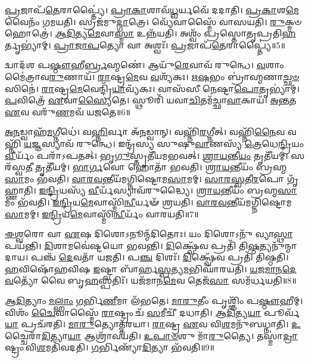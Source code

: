 \-\ul{𑌪𑍍𑌰}\-𑌜𑌾𑌪᳴\-\ul{𑌤𑍇}\-𑌰𑌾𑌪𑍍𑌤𑍍𑌯𑍈॑।
\-\ul{𑌪𑍍𑌰𑌾}\-\-\ul{𑌕𑌾}\-𑌶𑌾𑌵᳴\-\ul{𑌧𑍍𑌵}\-𑌰𑍍𑌯𑌵𑍇᳴ 𑌦𑌦𑌾𑌤𑌿।
\-\ul{𑌪𑍍𑌰}\-\-\ul{𑌕𑌾}\-𑌶\-\ul{𑌮𑍇}\-𑌵𑍈𑌨𑌂᳴ 𑌗𑌮𑌯𑌤𑌿।
𑌸𑍍𑌰𑌜᳴𑌮𑍁\-\ul{𑌦𑍍𑌗𑌾}\-𑌤𑍍𑌰𑍇।
𑌵𑍍𑌯𑍇᳴𑌵𑌾𑌸𑍍𑌮𑍈᳴ 𑌵𑌾𑌸𑌯𑌤𑌿।
\-\ul{𑌰𑍁}\-𑌕𑍍𑌮𑍞 𑌹𑍋𑌤𑍍𑌰𑍇॑।
\-\ul{𑌆}\-\-\ul{𑌦𑌿}\-𑌤𑍍𑌯\-\ul{𑌮𑍇}\-𑌵𑌾\-\ul{𑌸𑍍𑌮𑌾} 𑌉𑌨𑍍𑌨᳴𑌯𑌤𑌿।
𑌅𑌶𑍍𑌵𑌂᳴ 𑌪𑍍𑌰𑌸𑍍𑌤𑍋𑌤𑍃𑌪𑍍𑌰𑌤𑌿\-\ul{𑌹}\-𑌰𑍍𑌤𑍃𑌭𑍍𑌯𑌾॑𑌮𑍍।
\-\ul{𑌪𑍍𑌰𑌾}\-\-\ul{𑌜𑌾}\-\-\ul{𑌪}\-𑌤𑍍𑌯𑍋 𑌵𑌾 𑌅𑌶𑍍𑌵𑌃᳴।
\-\ul{𑌪𑍍𑌰}\-𑌜𑌾𑌪᳴\-\ul{𑌤𑍇}\-𑌰𑌾𑌪𑍍𑌤𑍍𑌯𑍈॑॥5॥

𑌦𑍍𑌵𑌾𑌦᳴𑌶 𑌪\-\ul{𑌷𑍍𑌠𑍗}\-𑌹𑍀\-\ul{𑌰𑍍𑌬𑍍𑌰}\-𑌹𑍍𑌮𑌣𑍇॑।
𑌆𑌯𑍁᳴\-\ul{𑌰𑍇}\-𑌵𑌾𑌵᳴ 𑌰𑍁𑌨𑍍𑌧𑍇।
\-\ul{𑌵}\-𑌶𑌾𑌂 𑌮𑍈॑𑌤𑍍𑌰𑌾𑌵\-\ul{𑌰𑍁}\-𑌣𑌾𑌯᳴।
\-\ul{𑌰𑌾}\-𑌷𑍍𑌟𑍍𑌰\-\ul{𑌮𑍇}\-𑌵 \ul{𑌵}\-𑌶𑍍𑌯᳴𑌕𑌃।
\-\ul{𑌋}\-\-\ul{𑌷}\-𑌭𑌂 𑌬𑍍𑌰𑌾॑𑌹𑍍𑌮𑌣𑌾\-\ul{𑌚𑍍𑌛}\-\-\ul{𑍞}\-𑌸𑌿𑌨𑍇॑।
\-\ul{𑌰𑌾}\-𑌷𑍍𑌟𑍍𑌰\-\ul{𑌮𑍇}\-𑌵𑍇𑌨𑍍𑌦𑍍𑌰𑌿᳴\-\ul{𑌯𑌾}\-\-𑌵𑍍𑌯᳴𑌕𑌃।
𑌵𑌾𑌸᳴𑌸𑍀 𑌨𑍇𑌷𑍍𑌟𑌾\-\ul{𑌪𑍋}\-𑌤𑍃𑌭𑍍𑌯𑌾॑𑌮𑍍।
\-\ul{𑌪}\-𑌵𑌿𑌤𑍍𑌰𑍇᳴ \ul{𑌏}\-𑌵𑌾\-\ul{𑌸𑍍𑌯𑍈}\-𑌤𑍇।
𑌸𑍍𑌥𑍂𑌰𑌿᳴ 𑌯𑌵𑌾\-\ul{𑌚𑌿}\-𑌤𑌮᳴𑌚𑍍𑌛𑌾\-\ul{𑌵𑌾}\-𑌕𑌾𑌯᳴।
\-\ul{𑌅}\-\-\ul{𑌨𑍍𑌤}\-𑌤 \ul{𑌏}\-𑌵 𑌵𑌰𑍁᳴\-\ul{𑌣}\-𑌮𑌵᳴ 𑌯𑌜𑌤𑍇॥6॥

\-\ul{𑌅}\-\-\ul{𑌨}\-𑌡𑍍𑌵𑌾𑌹᳴\-\ul{𑌮}\-𑌗𑍍𑌨𑍀𑌧𑍇॑।
𑌵\-\ul{𑌹𑍍𑌨𑌿}\-𑌰𑍍𑌵𑌾 𑌅᳴\-\ul{𑌨}\-𑌡𑍍𑌵𑌾𑌨𑍍।
𑌵𑌹𑍍𑌨𑌿᳴\-\ul{𑌰}\-𑌗𑍍𑌨𑍀𑌤𑍍।
𑌵𑌹𑍍𑌨𑌿᳴\-\ul{𑌨𑍈}\-𑌵 𑌵𑌹𑍍𑌨𑌿᳴ \ul{𑌯}\-𑌜𑍍𑌞𑌸𑍍𑌯𑌾𑌵᳴ 𑌰𑍁𑌨𑍍𑌧𑍇।
𑌇𑌨𑍍𑌦𑍍𑌰᳴𑌸𑍍𑌯 𑌸𑍁𑌷𑍁\-\ul{𑌵𑌾}\-𑌣𑌸𑍍𑌯᳴ \ul{𑌤𑍍𑌰𑍇}\-𑌧𑍇\-\ul{𑌨𑍍𑌦𑍍𑌰𑌿}\-𑌯𑌂 \ul{𑌵𑍀}\-𑌰𑍍𑌯𑌂᳴ 𑌪𑌰𑌾᳴\-𑌽𑌪𑌤𑌤𑍍।
𑌭𑍃\-\ul{𑌗𑍁}\-𑌸𑍍𑌤𑍃𑌤𑍀᳴𑌯𑌮𑌭𑌵𑌤𑍍।
\-\ul{𑌶𑍍𑌰𑌾}\-\-\ul{𑌯}\-𑌨𑍍𑌤𑍀\-\ul{𑌯𑌂} 𑌤𑍃𑌤𑍀᳴𑌯𑌮𑍍।
𑌸𑌰᳴𑌸𑍍𑌵\-\ul{𑌤𑍀} 𑌤𑍃𑌤𑍀᳴𑌯𑌮𑍍।
\-\ul{𑌭𑌾}\-\-\ul{𑌰𑍍𑌗}\-𑌵𑍋 𑌹𑍋𑌤𑌾᳴ 𑌭𑌵𑌤𑌿।
\-\ul{𑌶𑍍𑌰𑌾}\-\-\ul{𑌯}\-𑌨𑍍𑌤𑍀𑌯𑌂᳴ 𑌬𑍍𑌰𑌹𑍍𑌮\-\ul{𑌸𑌾}\-𑌮𑌂 𑌭᳴𑌵𑌤𑌿।
\-\ul{𑌵𑌾}\-\-\ul{𑌰}\-\-\ul{𑌵}\-𑌨𑍍𑌤𑍀𑌯᳴𑌮𑌗𑍍𑌨𑌿𑌷𑍍𑌟𑍋𑌮\-\ul{𑌸𑌾}\-𑌮𑌮𑍍।
\-\ul{𑌸𑌾}\-\-\ul{𑌰}\-\-\ul{𑌸𑍍𑌵}\-𑌤𑍀\-\ul{𑌰}\-𑌪𑍋 𑌗𑍃᳴𑌹𑍍𑌣𑌾𑌤𑌿।
\-\ul{𑌇}\-\-\ul{𑌨𑍍𑌦𑍍𑌰𑌿}\-𑌯𑌸𑍍𑌯᳴ \ul{𑌵𑍀}\-𑌰𑍍𑌯᳴𑌸𑍍𑌯𑌾𑌵᳴𑌰𑍁𑌦𑍍𑌧𑍍𑌯𑍈।
\-\ul{𑌶𑍍𑌰𑌾}\-\-\ul{𑌯}\-𑌨𑍍𑌤𑍀𑌯𑌂᳴ 𑌬𑍍𑌰𑌹𑍍𑌮\-\ul{𑌸𑌾}\-𑌮𑌂 𑌭᳴𑌵𑌤𑌿।
\-\ul{𑌇}\-\-\ul{𑌨𑍍𑌦𑍍𑌰𑌿}\-𑌯\-\ul{𑌮𑍇}\-𑌵𑌾𑌸𑍍𑌮𑌿᳴\-\ul{𑌨𑍍𑌵𑍀}\-𑌰𑍍𑌯𑍟᳴ 𑌶𑍍𑌰𑌯𑌤𑌿।
\-\ul{𑌵𑌾}\-\-\ul{𑌰}\-\-\ul{𑌵}\-𑌨𑍍𑌤𑍀𑌯᳴𑌮𑌗𑍍𑌨𑌿𑌷𑍍𑌟𑍋𑌮\-\ul{𑌸𑌾}\-𑌮𑌮𑍍।
\-\ul{𑌇}\-\-\ul{𑌨𑍍𑌦𑍍𑌰𑌿}\-𑌯\-\ul{𑌮𑍇}\-𑌵𑌾𑌸𑍍𑌮𑌿᳴\-\ul{𑌨𑍍𑌵𑍀}\-𑌰𑍍𑌯𑌂᳴ 𑌵𑌾𑌰𑌯𑌤𑌿॥7॥\anuvakamend[\-\ul{𑌵𑌿}\-𑌰𑌾\-\ul{𑌟𑍍𑌪𑍍𑌰}\-𑌜𑌾𑌪᳴\-\ul{𑌤𑌿}\-𑌰𑌶𑍍𑌵𑌃᳴ \ul{𑌪𑍍𑌰}\-𑌜𑌾𑌪᳴\-\ul{𑌤𑍇}\-𑌰𑌾𑌪𑍍𑌤𑍍𑌯𑍈᳴ 𑌯𑌜𑌤𑍇 𑌬𑍍𑌰𑌹𑍍𑌮\-\ul{𑌸𑌾}\-𑌮𑌂 𑌭᳴𑌵𑌤𑌿 \ul{𑌸}\-𑌪𑍍𑌤 𑌚᳴]

\-\ul{𑌈}\-\-\ul{𑌶𑍍𑌵}\-𑌰𑍋 𑌵𑌾 \ul{𑌏}\-𑌷 𑌦𑌿𑌶𑍋\-𑌽𑌨𑍂𑌨𑍍𑌮᳴𑌦𑌿𑌤𑍋𑌃।
𑌯𑌂 𑌦𑌿𑌶𑍋𑌽𑌨𑍁᳴ 𑌵𑍍𑌯𑌾\-\ul{𑌸𑍍𑌥𑌾}\-𑌪𑌯᳴𑌨𑍍𑌤𑌿।
\-\ul{𑌦𑌿}\-𑌶𑌾𑌮𑌵𑍇॑𑌷𑍍𑌟𑌯𑍋 𑌭𑌵𑌨𑍍𑌤𑌿।
\-\ul{𑌦𑌿}\-𑌕𑍍𑌷𑍍𑌵𑍇᳴𑌵 𑌪𑍍𑌰𑌤𑌿᳴ 𑌤𑌿\-\ul{𑌷𑍍𑌠}\-𑌤𑍍𑌯𑌨𑍁᳴𑌨𑍍𑌮𑌾𑌦𑌾𑌯।
𑌪𑌞𑍍𑌚᳴ \ul{𑌦𑍇}\-𑌵𑌤𑌾᳴ 𑌯𑌜𑌤𑌿।
𑌪\-\ul{𑌞𑍍𑌚} 𑌦𑌿𑌶𑌃᳴।
\-\ul{𑌦𑌿}\-𑌕𑍍𑌷𑍍𑌵𑍇᳴𑌵 𑌪𑍍𑌰𑌤𑌿᳴ 𑌤𑌿𑌷𑍍𑌠𑌤𑌿।
\-\ul{𑌹}\-𑌵𑌿𑌷𑍋᳴𑌹𑌵𑌿𑌷 \ul{𑌇}\-𑌷𑍍𑌟𑍍𑌵𑌾 𑌬𑌾᳴𑌰𑍍\mbox{}𑌹\-\ul{𑌸𑍍𑌪}\-𑌤𑍍𑌯\-\ul{𑌮}\-𑌭𑌿𑌘𑌾᳴𑌰𑌯𑌤𑌿।
\-\ul{𑌯}\-\-\ul{𑌜}\-\-\ul{𑌮𑌾}\-\-\ul{𑌨}\-\-\ul{𑌦𑍇}\-\-\ul{𑌵}\-𑌤𑍍𑌯𑍋᳴ 𑌵𑍈 𑌬𑍃\-\ul{𑌹}\-𑌸𑍍𑌪𑌤𑌿𑌃᳴।
𑌯𑌜᳴𑌮𑌾𑌨\-\ul{𑌮𑍇}\-𑌵 𑌤𑍇𑌜᳴\-\ul{𑌸𑌾} 𑌸𑌮᳴𑌰𑍍𑌧𑌯𑌤𑌿॥8॥

\-\ul{𑌆}\-\-\ul{𑌦𑌿}\-𑌤𑍍𑌯𑌾𑌂 \ul{𑌮}\-\-\ul{𑌲𑍍}\-𑌹𑌾𑌂 \ul{𑌗}\-𑌰𑍍𑌭𑌿\-\ul{𑌣𑍀}\-𑌮𑌾 𑌲᳴𑌭𑌤𑍇।
\-\ul{𑌮𑌾}\-\-\ul{𑌰𑍁}\-𑌤𑍀𑌂 𑌪𑍃𑌶𑍍𑌞𑌿𑌂᳴ 𑌪\-\ul{𑌷𑍍𑌠𑍗}\-𑌹𑍀𑌮𑍍।
𑌵𑌿𑌶𑌂᳴ \ul{𑌚𑍈}\-𑌵𑌾𑌸𑍍𑌮𑍈᳴ \ul{𑌰𑌾}\-𑌷𑍍𑌟𑍍𑌰𑌂 𑌚᳴ \ul{𑌸}\-𑌮𑍀𑌚𑍀᳴ 𑌦𑌧𑌾𑌤𑌿।
\-\ul{𑌆}\-\-\ul{𑌦𑌿}\-𑌤𑍍𑌯\-\ul{𑌯𑌾} 𑌪𑍂𑌰𑍍𑌵᳴\-\ul{𑌯𑌾} 𑌪𑍍𑌰𑌚᳴𑌰𑌤𑌿।
\-\ul{𑌮𑌾}\-\-\ul{𑌰𑍁}\-𑌤𑍍𑌯𑍋𑌤𑍍𑌤᳴𑌰𑌯𑌾।
\-\ul{𑌰𑌾}\-𑌷𑍍𑌟𑍍𑌰 \ul{𑌏}\-𑌵 𑌵𑌿\-\ul{𑌶}\-𑌮𑌨𑍁᳴𑌬𑌧𑍍𑌨𑌾𑌤𑌿।
\-\ul{𑌉}\-𑌚𑍍𑌚𑍈𑌰𑌾᳴\-\ul{𑌦𑌿}\-𑌤𑍍𑌯𑌾\-\ul{𑌯𑌾} 𑌆𑌶𑍍𑌰𑌾᳴𑌵𑌯𑌤𑌿।
\-\ul{𑌉}\-\-\ul{𑌪𑌾}\-\-\ul{𑍞}\-𑌶𑍁 𑌮𑌾᳴\-\ul{𑌰𑍁}\-𑌤𑍍𑌯𑍈।
𑌤𑌸𑍍𑌮𑌾॑\-\ul{𑌦𑍍𑌰𑌾}\-𑌷𑍍𑌟𑍍𑌰𑌂 𑌵𑌿\-\ul{𑌶}\-𑌮𑌤𑌿᳴𑌵𑌦𑌤𑌿।
\-\ul{𑌗}\-𑌰𑍍𑌭𑌿𑌣𑍍𑌯𑌾᳴\-\ul{𑌦𑌿}\-𑌤𑍍𑌯𑌾 𑌭᳴𑌵𑌤𑌿॥9॥

